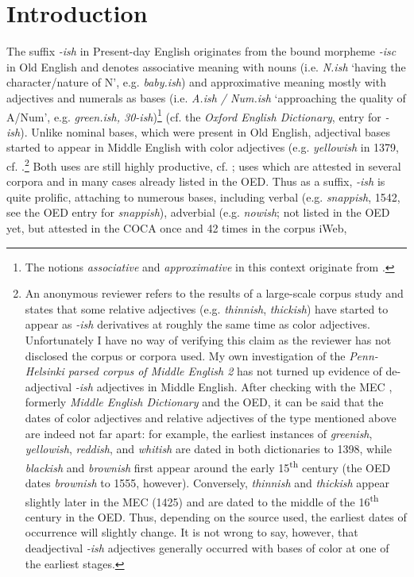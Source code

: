 \documentclass[output=paper]{langsci/langscibook}
\author{Tabea Harris\affiliation{Universität Mannheim}}
\begin{document}
\maketitle
{}
\section{Introduction}
The suffix \textit{-ish} in Present-day English originates from the bound morpheme \textit{-isc} in Old English and denotes associative meaning with nouns (i.e. \textit{N.ish} `having the character/nature of N', e.g. \textit{baby.ish}) and approximative meaning mostly with adjectives and numerals as bases (i.e. \textit{A.ish / Num.ish} `approaching the quality of A/Num', e.g. \textit{green.ish, 30-ish})\footnote{The notions \textit{associative} and \textit{approximative} in this context originate from \citet*{Traugott2013}.} (cf. the \textit{Oxford English Dictionary}, \citet{OED2015} entry for \textit{-ish}). Unlike nominal bases, which were present in Old English, adjectival bases started to appear in Middle English with color adjectives (e.g. \textit{yellowish} in 1379, cf. \textcite[306]{marchand_categories_1969}.\footnote{An anonymous reviewer refers to the results of a large-scale corpus study and states that some relative adjectives (e.g. \textit{thinnish}, \textit{thickish}) have started to appear as \textit{-ish} derivatives at roughly the same time as color adjectives. Unfortunately I have no way of verifying this claim as the reviewer has not disclosed the corpus or corpora used. My own investigation of the \textit{Penn-Helsinki parsed corpus of Middle English 2} \citep{PPCME2} has not turned up evidence of de-adjectival \textit{-ish} adjectives in Middle English. After checking with the MEC \citep{MED-MEC}, formerly \textit{Middle English Dictionary} and the OED, it can be said that the dates of color adjectives and relative adjectives of the type mentioned above are indeed not far apart: for example, the earliest instances of \textit{greenish}, \textit{yellowish}, \textit{reddish}, and \textit{whitish} are dated in both dictionaries to 1398, while \textit{blackish} and \textit{brownish} first appear around the early 15\textsuperscript{th} century (the OED dates \textit{brownish} to 1555, however). Conversely, \textit{thinnish} and \textit{thickish} appear slightly later in the MEC (1425) and are dated to the middle of the 16\textsuperscript{th} century in the OED. Thus, depending on the source used, the earliest dates of occurrence will slightly change. It is not wrong to say, however, that deadjectival \textit{-ish} adjectives generally occurred with bases of color at one of the earliest stages.} Both uses are still highly productive, cf. \textcite[305]{Bauer2013}; \textcite[235]{Dixon2014} uses which are attested in several corpora and in many cases already listed in the OED. Thus as a suffix,  \textit{-ish} is quite prolific, attaching to numerous bases, including verbal (e.g.  \textit{snappish}, 1542, see the OED entry for \textit{snappish}), adverbial (e.g.  \textit{nowish}; not listed in the OED yet, but attested in the COCA \citet{Davies2008} once and 42 times in the corpus iWeb, 
\end{document}
